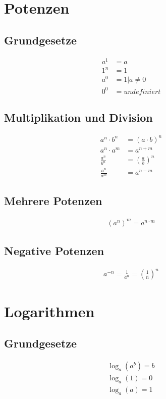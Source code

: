 \section{Potenzen}
\subsection{Grundgesetze}
\begin{align*}
a^1 &= a \\
1^n &= 1 \\
a^0 &= 1 | a \neq 0 \\
0^0 &= undefiniert
\end{align*}

\subsection{Multiplikation und Division}
\begin{align*}
a^n \cdot b^n &= (a \cdot b)^n \\
a^n \cdot a^m &= a^{n+m} \\
\frac{a^n}{b^n} &= \left(\frac{a}{b}\right)^n \\
\frac{a^n}{a^m} &= a^{n-m} 
\end{align*}

\subsection{Mehrere Potenzen}
\begin{align*}
\left(a^n\right)^m = a^{n \cdot m}
\end{align*}

\subsection{Negative Potenzen}
\begin{align*}
a^{-n} = \frac{1}{a^n} = \left(\frac{1}{n}\right)^n
\end{align*}


\section{Logarithmen}
\subsection{Grundgesetze}
\begin{align*}
\log_a(a^b) = b \\
\log_a(1) = 0 \\
\log_a(a) = 1
\end{align*}


